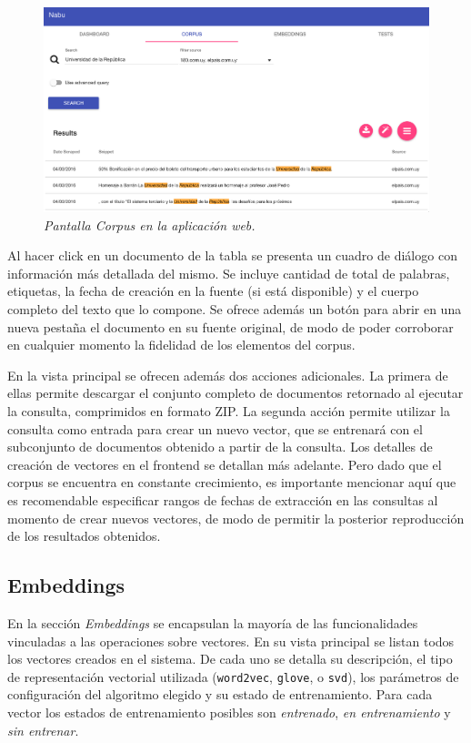 \begin{figure}[h]
    \centering
    \includegraphics[width=\textwidth]{images/ui-nabu-corpus}
    \caption{\textit{Pantalla Corpus en la aplicación web.}}
    \label{fig:ui-nabu-corpus}
\end{figure}

Al hacer click en un documento de la tabla se presenta un cuadro de diálogo con información más detallada
del mismo. Se incluye cantidad de total de palabras, etiquetas, la fecha de creación en la fuente (si está
disponible) y el cuerpo completo del texto que lo compone. Se ofrece además un botón para abrir en una
nueva pestaña el documento en su fuente original, de modo de poder corroborar en cualquier momento la
fidelidad de los elementos del corpus.

En la vista principal se ofrecen además dos acciones adicionales. La primera de ellas permite descargar el
conjunto completo de documentos retornado al ejecutar la consulta, comprimidos en formato ZIP. La segunda
acción permite utilizar la consulta como entrada para crear un nuevo vector, que se entrenará con el
subconjunto de documentos obtenido a partir de la consulta. Los detalles de creación de vectores en el
frontend se detallan más adelante. Pero dado que el corpus se encuentra en constante crecimiento, es
importante mencionar aquí que es recomendable especificar rangos de fechas de extracción en las consultas
al momento de crear nuevos vectores, de modo de permitir la posterior reproducción de los resultados
obtenidos.

\subsection{Embeddings}

En la sección \textit{Embeddings} se encapsulan la mayoría de las funcionalidades vinculadas a las
operaciones sobre vectores. En su vista principal se listan todos los vectores creados en el sistema.
De cada uno se detalla su descripción, el tipo de representación vectorial utilizada (\texttt{word2vec},
\texttt{glove}, o \texttt{svd}), los parámetros de configuración del algoritmo elegido y su estado de
entrenamiento. Para cada vector los estados de entrenamiento posibles son \textit{entrenado},
\textit{en entrenamiento} y \textit{sin entrenar}.

